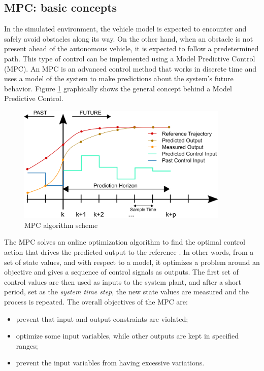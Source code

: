 \subsection{MPC: basic concepts}
In the simulated environment, the vehicle model is expected to encounter and safely avoid obstacles along its way. On the other hand, when an obstacle is not present ahead of the autonomous vehicle, it is expected to follow a predetermined path.
This type of control can be implemented using a Model Predictive Control (MPC).
An MPC is an advanced control method that works in discrete time and uses a model of the system to make predictions about the system’s future behavior. 
Figure \ref{fig:MPC_scheme} graphically shows the general concept behind a Model Predictive Control.
\begin{figure}[H]
    \centering
    \includegraphics[width=0.9\textwidth]{Figures/MPC_scheme_basic.png}
    \caption{MPC algorithm scheme}
    \label{fig:MPC_scheme}
\end{figure}
The MPC solves an online optimization algorithm to find the optimal control action that drives the predicted output to the reference \cite{MPC_Def}. In other words, from a set of state values, and with respect to a model, it optimizes a problem around an objective and gives a sequence of control signals as outputs. The first set of control values are then used as inputs to the system plant, and after a short period, set as the \emph{system time step}, the new state values are measured and the process is repeated.
The overall objectives of the MPC are:
\begin{itemize}
 

\item prevent that input and output constraints are violated;
\item optimize some input variables, while other outputs are kept in specified ranges;
\item prevent the input variables from having excessive variations.
\end{itemize}
